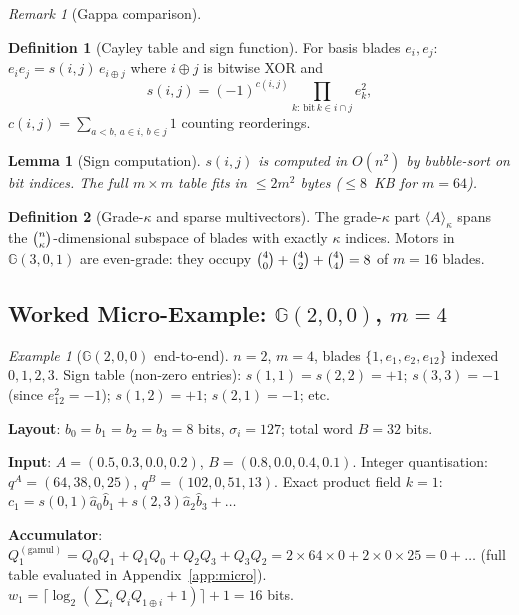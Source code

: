 \documentclass[11pt,a4paper]{article}
\theoremstyle{definition}
\newtheorem{definition}{Definition}[section]
\theoremstyle{plain}
\newtheorem{lemma}{Lemma}[section]
\theoremstyle{remark}
\newtheorem{remark}{Remark}[section]
\newtheorem{example}{Example}[section]
\newcommand{\GA}{\mathbb{G}}
\newcommand{\ceil}[1]{\lceil #1 \rceil}
\begin{document}
\begin{remark}[Gappa comparison]
\begin{definition}[Cayley table and sign function]\label{def:cayley}
For basis blades $e_i, e_j$:\ $e_i e_j = s(i,j)\, e_{i\oplus j}$
where $i\oplus j$ is bitwise XOR and
\begin{equation}\label{eq:sign}
  s(i,j) = (-1)^{c(i,j)} \prod_{k:\,\mathrm{bit}\,k \in i\cap j} e_k^2,
\end{equation}
$c(i,j) = \sum_{a<b,\,a\in i,\,b\in j} 1$ counting reorderings.
\end{definition}

\begin{lemma}[Sign computation]\label{lem:sign}
$s(i,j)$ is computed in $O(n^2)$ by bubble-sort on bit indices.
The full $m\times m$ table fits in $\le 2m^2$ bytes ($\le 8$~KB for $m=64$).
\end{lemma}

\begin{definition}[Grade-$\kappa$ and sparse multivectors]\label{def:grade}
The grade-$\kappa$ part $\langle A\rangle_\kappa$ spans the
$\tbinom{n}{\kappa}$-dimensional subspace of blades with exactly
$\kappa$ indices.
Motors in $\GA(3,0,1)$ are even-grade: they occupy
$\tbinom{4}{0}+\tbinom{4}{2}+\tbinom{4}{4} = 8$ of $m=16$ blades.
\end{definition}

\subsection{Worked Micro-Example: $\GA(2,0,0)$, $m=4$}
\label{sec:micro}

\begin{example}[$\GA(2,0,0)$ end-to-end]
\label{ex:micro}
$n=2$, $m=4$, blades $\{1, e_1, e_2, e_{12}\}$ indexed $0,1,2,3$.
Sign table (non-zero entries): $s(1,1)=s(2,2)=+1$;
$s(3,3)=-1$ (since $e_{12}^2=-1$); $s(1,2)=+1$; $s(2,1)=-1$; etc.

\textbf{Layout}: $b_0=b_1=b_2=b_3=8$ bits, $\sigma_i=127$;
total word $B=32$ bits.

\textbf{Input}: $A=(0.5, 0.3, 0.0, 0.2)$, $B=(0.8, 0.0, 0.4, 0.1)$.
Integer quantisation: $q^A = (64, 38, 0, 25)$, $q^B=(102,0,51,13)$.
Exact product field $k=1$: $c_1 = s(0,1)\hat{a}_0\hat{b}_1 + s(2,3)\hat{a}_2\hat{b}_3 + \ldots$

\textbf{Accumulator}: $Q_1^{(\mathrm{gamul})} = Q_0 Q_1 + Q_1 Q_0 + Q_2 Q_3 + Q_3 Q_2
  = 2\times64\times0 + 2\times0\times25 = 0 + \ldots$ (full table evaluated in Appendix~\ref{app:micro}).
$w_1 = \ceil{\log_2(\sum_i Q_i Q_{1\oplus i}+1)}+1 = 16$ bits.


\end{example}
\end{remark}
\end{document}
